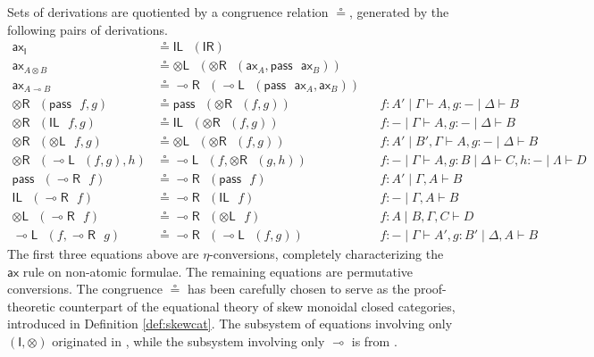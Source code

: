 \documentclass[copyright,creativecommons]{eptcs}
\theoremstyle{definition}
\newcommand{\tl}{\otimes \mathsf{L}}
\newcommand{\tr}{\otimes \mathsf{R}}
\newcommand{\lright}{{\multimap}\mathsf{R}}
\newcommand{\lleft}{{\multimap}\mathsf{L}}
\newcommand{\pass}{\mathsf{pass}}
\newcommand{\unitl}{\mathsf{IL}}
\newcommand{\unitr}{\mathsf{IR}}
\newcommand{\ax}{\mathsf{ax}}
\newcommand{\ot}{\otimes}
\newcommand{\lolli}{\multimap}
\newcommand{\I}{\mathsf{I}}
\newcommand{\niccolo}[1]{{\color{red}\textbf{Niccol{\`o}: }#1}}
\begin{document}
Sets of derivations are quotiented by a congruence relation $\circeq$, generated by the following pairs of derivations.
\begin{equation}
\label{fig:circeq}
\begin{array}{rlll}
  \ax_{\I} &\circeq \unitl \text{ } (\unitr)
  \\
  \ax_{A \ot B} &\circeq \tl \text{ } (\tr \text{ } (\ax_{A} , \pass \text{ } \ax_{B}))
  \\
  \ax_{A \lolli B} &\circeq \lright \text{ } (\lleft \text{ } (\pass \text{ } \ax_{A}, \ax_{B} ))
  \\
  \tr \text{ } (\pass \text{ } f, g) &\circeq \pass \text{ } (\tr \text{ } (f, g)) &&f : A' \mid \Gamma \vdash A, g : {-} \mid \Delta \vdash B
  \\
  \tr \text{ } (\unitl \text{ } f, g) &\circeq \unitl \text{ } (\tr \text{ } (f , g)) &&f : {-} \mid \Gamma \vdash A , g : {-} \mid \Delta \vdash B
  \\
  \tr \text{ } (\tl \text{ } f, g) &\circeq \tl \text{ } (\tr \text{ } (f , g)) &&f : A' \mid B' , \Gamma \vdash A , g : {-} \mid \Delta \vdash B
  \\
  \tr \text{ } (\lleft \text{ } (f , g), h) & \circeq \lleft \text{ } (f, \tr \text{ } (g, h)) &&f: {-} \mid \Gamma \vdash A, g : B \mid \Delta \vdash C, h : {-} \mid \Lambda \vdash D
  \\
  \pass \text{ } (\lright \text{ } f) &\circeq \lright \text{ } (\pass \text{ } f) &&f : A' \mid \Gamma , A \vdash B
  \\
  \unitl \text{ } (\lright \text{ } f) &\circeq \lright \text{ } (\unitl \text{ } f) &&f : {-} \mid \Gamma , A \vdash B
  \\
  \tl \text{ } (\lright \text{ } f) &\circeq \lright \text{ } (\tl \text{ } f) &&f : A \mid B , \Gamma , C \vdash D
  \\
  \lleft \text{ } (f, \lright \text{ } g) &\circeq \lright \text{ } (\lleft \text{ } (f, g)) &&f : {-} \mid \Gamma \vdash A', g : B' \mid \Delta , A \vdash B
\end{array}
\end{equation}
The first three equations above are $\eta$-conversions, completely characterizing the $\ax$ rule on non-atomic formulae. The remaining equations are permutative conversions. The congruence $\circeq$ has been carefully chosen to serve as the proof-theoretic counterpart of the equational theory of skew monoidal closed categories, introduced in Definition \ref{def:skewcat}. The subsystem of equations involving only $(\I,\ot)$ originated in \cite{uustalu:sequent:2021}, while the subsystem involving only $\lolli$ is from \cite{uustalu:deductive:nodate}.
\end{document}
